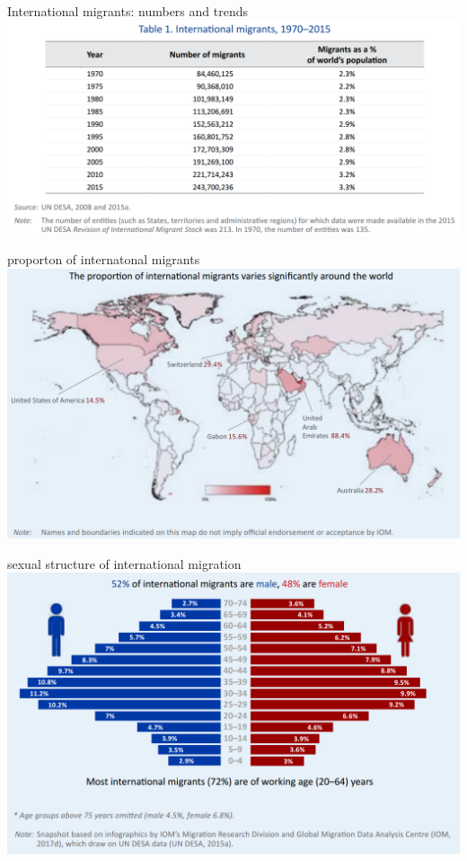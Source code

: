 \documentclass[10pt,hyperref={CJKbookmarks=true},xcolor=dvipsnames,aspectratio=169]{beamer}
\begin{document}
\begin{frame}{International migrants: numbers and trends}
\centering	\includegraphics[width=\columnwidth]{fig/migration/mig1}
\end{frame}

\begin{frame}{proporton of internatonal migrants}
\centering \includegraphics[width=0.8\columnwidth]{fig/migration/mig2}
\end{frame}

\begin{frame}{sexual structure of international migration}
\centering \includegraphics[width=0.8\columnwidth]{fig/migration/mig3}
\end{frame}
\end{document}

